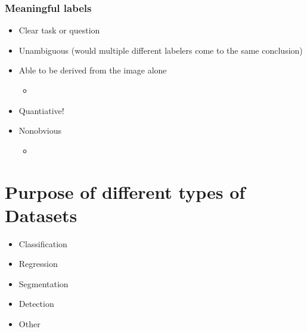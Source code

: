 \documentclass[letterpaper,10pt,english]{sphinxmanual}
\begin{document}
\subsection{Meaningful labels}
\label{\detokenize{03-Datasets:meaningful-labels}}\begin{itemize}
\item {} 
\sphinxAtStartPar
Clear task or question

\item {} 
\sphinxAtStartPar
Unambiguous (would multiple different labelers come to the same conclusion)

\item {} 
\sphinxAtStartPar
Able to be derived from the image alone
\begin{itemize}
\item {} 
\sphinxAtStartPar
{}

\end{itemize}

\item {} 
\sphinxAtStartPar
Quantiative!

\item {} 
\sphinxAtStartPar
Non\sphinxhyphen{}obvious
\begin{itemize}
\item {} 
\sphinxAtStartPar
{}

\end{itemize}

\end{itemize}


\chapter{Purpose of different types of Datasets}
\label{\detokenize{03-Datasets:purpose-of-different-types-of-datasets}}\begin{itemize}
\item {} 
\sphinxAtStartPar
Classification

\item {} 
\sphinxAtStartPar
Regression

\item {} 
\sphinxAtStartPar
Segmentation

\item {} 
\sphinxAtStartPar
Detection

\item {} 
\sphinxAtStartPar
Other

\end{itemize}
\end{document}
